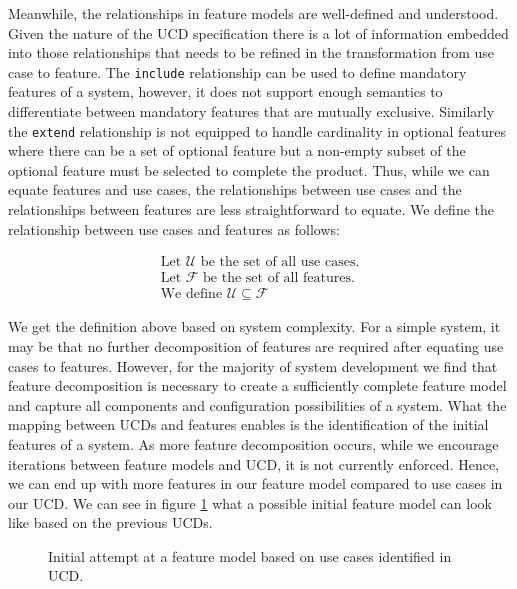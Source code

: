 Meanwhile, the relationships in feature models are well-defined and understood. Given the nature of the \ac{UCD} specification there is a lot of information embedded into those relationships that needs to be refined in the transformation from use case to feature. The \texttt{include} relationship can be used to define mandatory features of a system, however, it does not support enough semantics to differentiate between mandatory features that are mutually exclusive. Similarly the \texttt{extend} relationship is not equipped to handle cardinality in optional features where there can be a set of optional feature but a non-empty subset of the optional feature must be selected to complete the product. Thus, while we can equate features and use cases, the relationships between use cases and the relationships between features are less straightforward to equate. We define the relationship between use cases and features as follows:

\begin{gather}
	\text{Let } \mathcal{U} \text{ be the set of all use cases.}\\
	\text{Let } \mathcal{F} \text{ be the set of all features.}\\
	\text{We define } \mathcal{U} \subseteq \mathcal{F} 
\end{gather}

We get the definition above based on system complexity. For a simple system, it may be that no further decomposition of features are required after equating use cases to features. However, for the majority of system development we find that feature decomposition is necessary to create a sufficiently complete feature model and capture all components and configuration possibilities of a system. What the mapping between \ac{UCD}s and features enables is the identification of the initial features of a system. As more feature decomposition occurs, while we encourage iterations between feature models and \ac{UCD}, it is not currently enforced. Hence, we can end up with more features in our feature model compared to use cases in our \ac{UCD}. We can see in figure \ref{fig:FM_init} what a possible initial feature model can look like based on the previous \ac{UCD}s.


\begin{figure}
	\centering
	
	\caption{Initial attempt at a feature model based on use cases identified in \ac{UCD}.}
	\label{fig:FM_init}
\end{figure}

